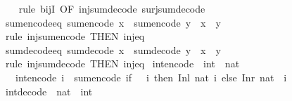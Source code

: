 \begin{isabellebody}
\ \ %
\endisadelimproof
%
\isatagproof
{}\isamarkupfalse%
\ {\isacharparenleft}rule\ bijI\ {\isacharbrackleft}OF\ inj{\isacharunderscore}sum{\isacharunderscore}decode\ surj{\isacharunderscore}sum{\isacharunderscore}decode{\isacharbrackright}{\isacharparenright}%
\endisatagproof
{\isafoldproof}%
%
\isadelimproof
\isanewline
%
\endisadelimproof
\isanewline
{}\isamarkupfalse%
\ sum{\isacharunderscore}encode{\isacharunderscore}eq{\isacharcolon}\ {\isachardoublequoteopen}sum{\isacharunderscore}encode\ x\ {\isacharequal}\ sum{\isacharunderscore}encode\ y\ {\isasymlongleftrightarrow}\ x\ {\isacharequal}\ y{\isachardoublequoteclose}\isanewline
%
\isadelimproof
\ \ %
\endisadelimproof
%
\isatagproof
{}\isamarkupfalse%
\ {\isacharparenleft}rule\ inj{\isacharunderscore}sum{\isacharunderscore}encode\ {\isacharbrackleft}THEN\ inj{\isacharunderscore}eq{\isacharbrackright}{\isacharparenright}%
\endisatagproof
{\isafoldproof}%
%
\isadelimproof
\isanewline
%
\endisadelimproof
\isanewline
{}\isamarkupfalse%
\ sum{\isacharunderscore}decode{\isacharunderscore}eq{\isacharcolon}\ {\isachardoublequoteopen}sum{\isacharunderscore}decode\ x\ {\isacharequal}\ sum{\isacharunderscore}decode\ y\ {\isasymlongleftrightarrow}\ x\ {\isacharequal}\ y{\isachardoublequoteclose}\isanewline
%
\isadelimproof
\ \ %
\endisadelimproof
%
\isatagproof
{}\isamarkupfalse%
\ {\isacharparenleft}rule\ inj{\isacharunderscore}sum{\isacharunderscore}decode\ {\isacharbrackleft}THEN\ inj{\isacharunderscore}eq{\isacharbrackright}{\isacharparenright}%
\endisatagproof
{\isafoldproof}%
%
\isadelimproof
%
\endisadelimproof
%
\isadelimdocument
%
\endisadelimdocument
%
\isatagdocument
%
\isamarkuptrue%
%
\endisatagdocument
{\isafolddocument}%
%
\isadelimdocument
%
\endisadelimdocument
{}\isamarkupfalse%
\ int{\isacharunderscore}encode\ {\isacharcolon}{\isacharcolon}\ {\isachardoublequoteopen}int\ {\isasymRightarrow}\ nat{\isachardoublequoteclose}\isanewline
\ \ \ {\isachardoublequoteopen}int{\isacharunderscore}encode\ i\ {\isacharequal}\ sum{\isacharunderscore}encode\ {\isacharparenleft}if\ {}\ {\isasymle}\ i\ then\ Inl\ {\isacharparenleft}nat\ i{\isacharparenright}\ else\ Inr\ {\isacharparenleft}nat\ {\isacharparenleft}{\isacharminus}\ i\ {\isacharminus}\ {}{\isacharparenright}{\isacharparenright}{\isacharparenright}{\isachardoublequoteclose}\isanewline
\isanewline
{}\isamarkupfalse%
\ int{\isacharunderscore}decode\ {\isacharcolon}{\isacharcolon}\ {\isachardoublequoteopen}nat\ {\isasymRightarrow}\ int{\isachardoublequoteclose}\isanewline

\end{isabellebody}
